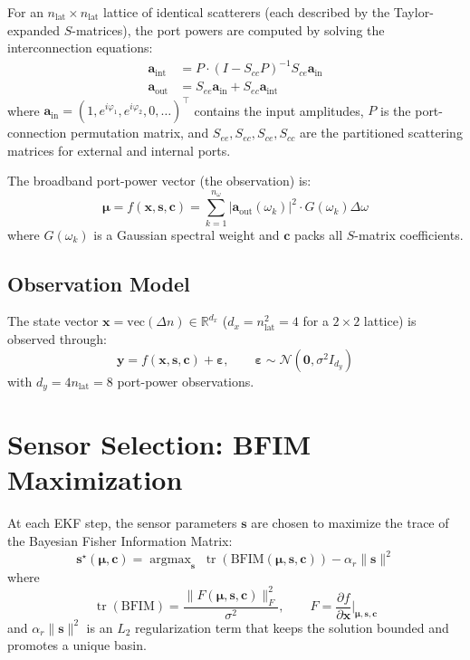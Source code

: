 \documentclass[11pt,a4paper]{article}
\newcommand{\R}{\mathbb{R}}
\newcommand{\tr}{\operatorname{tr}}
\newcommand{\argmax}{\operatorname{argmax}}
\begin{document}
For an $n_{\text{lat}} \times n_{\text{lat}}$ lattice of identical scatterers (each described by the Taylor-expanded $S$-matrices), the port powers are computed by solving the interconnection equations:
\begin{align}
  \bm{a}_{\text{int}} &= P \cdot (I - S_{cc} P)^{-1} S_{ce} \bm{a}_{\text{in}} \\
  \bm{a}_{\text{out}} &= S_{ee} \bm{a}_{\text{in}} + S_{ec} \bm{a}_{\text{int}}
\end{align}
where $\bm{a}_{\text{in}} = (1, e^{i\varphi_1}, e^{i\varphi_2}, 0, \ldots)^\top$ contains the input amplitudes, $P$ is the port-connection permutation matrix, and $S_{ee}, S_{ec}, S_{ce}, S_{cc}$ are the partitioned scattering matrices for external and internal ports.

The broadband port-power vector (the observation) is:
\[
  \bm{\mu} = f(\bm{x}, \bm{s}, \bm{c}) = \sum_{k=1}^{n_\omega} |\bm{a}_{\text{out}}(\omega_k)|^2 \cdot G(\omega_k) \Delta\omega
\]
where $G(\omega_k)$ is a Gaussian spectral weight and $\bm{c}$ packs all $S$-matrix coefficients.

\subsection{Observation Model}

The state vector $\bm{x} = \text{vec}(\Delta n) \in \R^{d_x}$ ($d_x = n_{\text{lat}}^2 = 4$ for a $2 \times 2$ lattice) is observed through:
\[
  \bm{y} = f(\bm{x}, \bm{s}, \bm{c}) + \bm{\varepsilon}, \qquad \bm{\varepsilon} \sim \mathcal{N}(\bm{0}, \sigma^2 I_{d_y})
\]
with $d_y = 4 n_{\text{lat}} = 8$ port-power observations.

\section{Sensor Selection: BFIM Maximization}

At each EKF step, the sensor parameters $\bm{s}$ are chosen to maximize the trace of the Bayesian Fisher Information Matrix:
\[
  \bm{s}^\star(\bm{\mu}, \bm{c}) = \argmax_{\bm{s}} \; \tr(\text{BFIM}(\bm{\mu}, \bm{s}, \bm{c})) - \alpha_r \|\bm{s}\|^2
\]
where
\[
  \tr(\text{BFIM}) = \frac{\|F(\bm{\mu}, \bm{s}, \bm{c})\|_F^2}{\sigma^2}, \qquad F = \frac{\partial f}{\partial \bm{x}}\bigg|_{\bm{\mu}, \bm{s}, \bm{c}}
\]
and $\alpha_r \|\bm{s}\|^2$ is an $L_2$ regularization term that keeps the solution bounded and promotes a unique basin.
\end{document}
